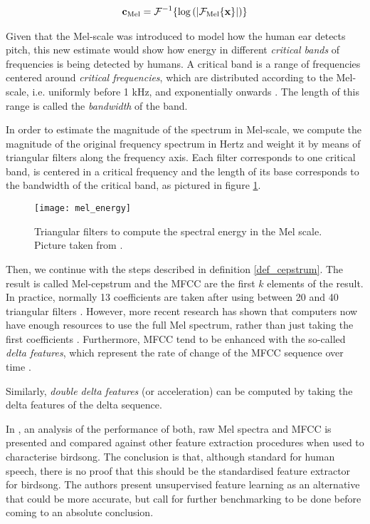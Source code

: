\documentclass[../main.tex]{subfiles} \label{chapter_soa}
\begin{document}
\begin{align*}
\mathbf{c}_{\text{Mel}} = \mathcal{F}^{-1}\{\log{(\lvert\mathcal{F}_{\text{Mel}}\{\mathbf{x}\}\rvert)}\}
\end{align*}
\par Given that the Mel-scale was introduced to model how the human ear detects pitch, this new estimate would show how energy in different \emph{critical bands} of frequencies is being detected by humans. A critical band is a range of frequencies centered around \emph{critical frequencies}, which are distributed according to the Mel-scale, i.e. uniformly before 1 kHz, and exponentially onwards \cite{Gutierrez-Osuna2009}. The length of this range is called the \emph{bandwidth} of the band.
\par In order to estimate the magnitude of the spectrum in Mel-scale, we compute the magnitude of the original frequency spectrum in Hertz and weight it by means of triangular filters along the frequency axis. Each filter corresponds to one critical band, is centered in a critical frequency and the length of its base corresponds to the bandwidth of the critical band, as pictured in figure \ref{mel_energy}.


\begin{figure}[t]
\texttt{[image: mel\_energy]}
\caption{Triangular filters to compute the spectral energy in the Mel scale. Picture taken from \cite{Sludge2000}.}
\label{mel_energy}
\end{figure}

\par Then, we continue with the steps described in definition \ref{def_cepstrum}. The result is called Mel-cepstrum and the MFCC are the first $k$ elements of the result. In practice, normally 13 coefficients are taken after using between 20 and 40 triangular filters \cite{Gutierrez-Osuna2009}. However, more recent research has shown that computers now have enough resources to use the full Mel spectrum, rather than just taking the first coefficients \cite{Stowell2014}. Furthermore, MFCC tend to be enhanced with the so-called \emph{delta features}, which represent the rate of change of the MFCC sequence over time \cite{Muda2010} \cite{Lyons2014}. 
\par Similarly, \emph{double delta features} (or acceleration) can be computed by taking the delta features of the delta sequence. 
\par In \cite{Stowell2014}, an analysis of the performance of both, raw Mel spectra and MFCC is presented and compared against other feature extraction procedures when used to characterise birdsong. The conclusion is that, although standard for human speech, there is no proof that this should be the standardised feature extractor for birdsong. The authors present unsupervised feature learning as an alternative that could be more accurate, but call for further benchmarking to be done before coming to an absolute conclusion.
\end{document}
